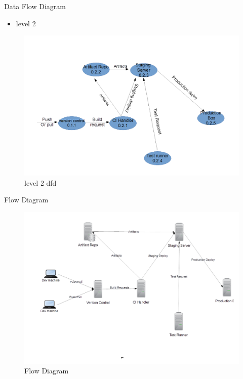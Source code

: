 \documentclass{beamer}
\begin{document}
\begin{frame}{Data Flow Diagram}
\begin{itemize}
\item level 2
\end{itemize}
\begin{figure}[h]
\begin{center}
\includegraphics[scale=0.28]{dfd3.png}
\caption{level 2 dfd}
\end{center}
\end{figure}
\end{frame}

\begin{frame}{Flow Diagram}

\begin{figure}[h]
\begin{center}
\includegraphics[scale=0.25]{flow1.png}
\caption{Flow Diagram}
\end{center}
\end{figure}
\end{frame}
\end{document}

